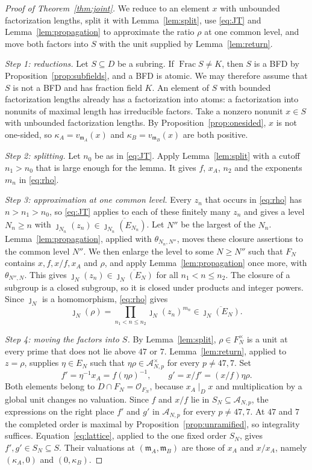 \documentclass[11pt]{article}
\theoremstyle{plain}
\theoremstyle{definition}
\theoremstyle{remark}
\DeclareMathOperator{\Frac}{Frac}
\newcommand{\OO}{\mathcal O}
\newcommand{\EA}{\mathfrak m_A}
\newcommand{\EB}{\mathfrak m_B}
\begin{document}
\begin{proof}[Proof of Theorem~\ref{thm:joint}]
We reduce to an element $x$ with unbounded factorization lengths, split
it with Lemma~\ref{lem:split}, use \eqref{eq:JT} and
Lemma~\ref{lem:propagation} to approximate the ratio $\rho$ at one common
level, and move both factors into $S$ with the unit supplied by
Lemma~\ref{lem:return}.

\emph{Step 1: reductions.}  Let $S\subseteq D$ be a subring.  If
$\Frac S\ne K$, then $S$ is a BFD by Proposition~\ref{prop:subfields}, and
a BFD is atomic.  We may therefore assume that $S$ is not a BFD and has
fraction field $K$.  An element of $S$ with bounded factorization lengths
already has a factorization into atoms: a factorization into nonunits of
maximal length has irreducible factors.  Take a nonzero nonunit $x\in S$
with unbounded factorization lengths.  By
Proposition~\ref{prop:onesided}, $x$ is not one-sided, so
$\kappa_A=v_{\EA}(x)$ and $\kappa_B=v_{\EB}(x)$ are both positive.

\emph{Step 2: splitting.}  Let $n_0$ be as in \eqref{eq:JT}.  Apply
Lemma~\ref{lem:split} with a cutoff $n_1>n_0$ that is large enough for the
lemma.  It gives $f$, $x_A$, $n_2$ and the exponents $m_n$ in
\eqref{eq:rho}.

\emph{Step 3: approximation at one common level.}  Every $z_n$ that occurs
in \eqref{eq:rho} has $n>n_1>n_0$, so \eqref{eq:JT} applies to each of
these finitely many $z_n$ and gives a level $N_n\ge n$ with
$\jmath_{N_n}(z_n)\in\overline{\jmath_{N_n}(E_{N_n})}$.  Let $N''$ be the
largest of the $N_n$.  Lemma~\ref{lem:propagation}, applied with
$\theta_{N_n,N''}$, moves these closure assertions to the common level
$N''$.  We then enlarge the level to some $N\ge N''$ such that $F_N$
contains $x,f,x/f,x_A$ and $\rho$, and apply
Lemma~\ref{lem:propagation} once more, with $\theta_{N'',N}$.  This gives
$\jmath_N(z_n)\in\overline{\jmath_N(E_N)}$ for all $n_1<n\le n_2$.  The
closure of a subgroup is a closed subgroup, so it is closed under products
and integer powers.  Since $\jmath_N$
is a homomorphism, \eqref{eq:rho} gives
\[
 \jmath_N(\rho)=\prod_{n_1<n\le n_2}\jmath_N(z_n)^{m_n}
 \in\overline{\jmath_N(E_N)}.
\]

\emph{Step 4: moving the factors into $S$.}  By Lemma~\ref{lem:split},
$\rho\in F_N^\times$ is a unit at every prime that does not lie above $47$
or $7$.  Lemma~\ref{lem:return}, applied to $z=\rho$, supplies
$\eta\in E_N$ such that $\eta\rho\in\mathcal A_{N,p}^{\times}$ for every
$p\ne47,7$.  Set
\[
 f'=\eta^{-1}x_A=f(\eta\rho)^{-1},\qquad
 g'=x/f'=(x/f)\eta\rho.
\]
Both elements belong to $D\cap F_N=\OO_{F_N}$, because $x_A\mid_Dx$ and
multiplication by a global unit changes no valuation.  Since $f$ and
$x/f$ lie in $S_N\subseteq\mathcal A_{N,p}$, the expressions on the right
place $f'$ and $g'$ in $\mathcal A_{N,p}$ for every $p\ne47,7$.  At $47$
and $7$ the completed order is maximal by
Proposition~\ref{prop:unramified}, so integrality suffices.
Equation~\eqref{eq:lattice}, applied to the one fixed order $S_N$, gives
$f',g'\in S_N\subseteq S$.  Their valuations at $(\EA,\EB)$ are those of
$x_A$ and $x/x_A$, namely $(\kappa_A,0)$ and $(0,\kappa_B)$.


\end{proof}
\end{document}
